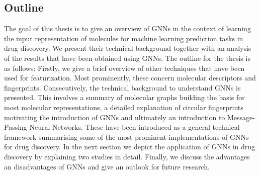 \subsection{Outline}
The goal of this thesis is to give an overview of GNNs in the context of learning the input representation of molecules for machine learning prediction tasks in drug discovery. We present their technical background together with an analysis of the results that have been obtained using GNNs. The outline for the thesis is as follows:
Firstly, we give a brief overview of other techniques that have been used for featurization. Most prominently, these concern molecular descriptors and fingerprints. Consecutively, the technical background to understand GNNs is presented. This involves a summary of molecular graphs building the basis for most molecular representations, a detailed explanation of circular fingerprints motivating the introduction of GNNs and ultimately an introduction to Message-Passing Neural Networks. These have been introduced as a general technical framework summarising some of the most prominent implementations of GNNs for drug discovery. In the next section we depict the application of GNNs in drug discovery by explaining two studies in detail. Finally, we discuss the advantages an disadvantages of GNNs and give an outlook for future research. 





